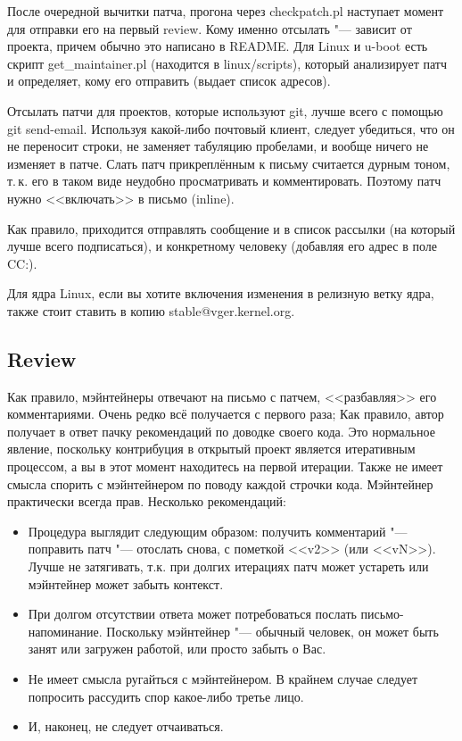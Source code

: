 \documentclass[10pt, a5paper]{article}
\begin{document}
После очередной вычитки патча, прогона через checkpatch.pl наступает момент для отправки его на первый review. Кому именно отсылать "--- зависит от проекта, причем обычно это написано в README. Для Linux и u-boot есть скрипт get\_maintainer.pl (находится в linux/scripts), который анализирует патч и определяет, кому его отправить (выдает список адресов).

Отсылать патчи для проектов, которые используют git, лучше всего с помощью git send-email. Используя какой-либо почтовый клиент, следует убедиться, что он не переносит строки, не заменяет табуляцию пробелами, и вообще ничего не изменяет в патче. Слать патч прикреплённым к письму считается дурным тоном, т.\,к. его в таком виде неудобно просматривать и комментировать. Поэтому патч нужно <<включать>> в письмо (inline).

Как правило, приходится отправлять сообщение и в список рассылки (на который лучше всего подписаться), и конкретному человеку (добавляя его адрес в поле CC:).

Для ядра Linux, если вы хотите включения изменения в релизную ветку ядра, также стоит ставить в копию stable@vger.kernel.org.

\subsection*{Review}

Как правило, мэйнтейнеры отвечают на письмо с патчем, <<разбавляя>> его комментариями. Очень редко всё получается с первого раза; Как правило, автор получает в ответ пачку рекомендаций по доводке своего кода. Это нормальное явление, поскольку контрибуция в открытый проект является итеративным процессом, а вы в этот момент находитесь на первой итерации. Также не имеет смысла спорить с мэйнтейнером по поводу каждой строчки кода. Мэйнтейнер практически всегда прав. Несколько рекомендаций:

\begin{itemize}
    \item Процедура выглядит следующим образом: получить комментарий "--- поправить патч "--- отослать снова, с пометкой <<v2>> (или <<vN>>). Лучше не затягивать, т.к. при долгих итерациях патч может устареть или мэйнтейнер может забыть контекст.
    \item При долгом отсутствии ответа может потребоваться послать письмо-напоминание. Поскольку мэйнтейнер "--- обычный человек, он может быть занят или загружен работой, или просто забыть о Вас.
    \item Не имеет смысла ругайться с мэйнтейнером. В крайнем случае следует попросить рассудить спор какое-либо третье лицо.
    \item И, наконец, не следует отчаиваться.
\end{itemize}
\end{document}

